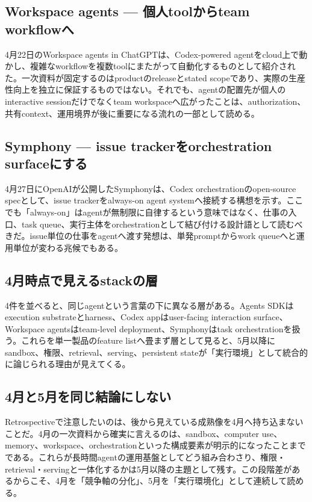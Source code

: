 \subsection{Workspace agents — 個人toolからteam workflowへ}

4月22日のWorkspace agents in ChatGPTは、Codex-powered agentをcloud上で動かし、複雑なworkflowを複数toolにまたがって自動化するものとして紹介された。一次資料が固定するのはproductのreleaseとstated scopeであり、実際の生産性向上を独立に保証するものではない。それでも、agentの配置先が個人のinteractive sessionだけでなくteam workspaceへ広がったことは、authorization、共有context、運用境界が後に重要になる流れの一部として読める。\autocite{src-c71ef79e3212}


\subsection{Symphony — issue trackerをorchestration surfaceにする}

4月27日にOpenAIが公開したSymphonyは、Codex orchestrationのopen-source specとして、issue trackerをalways-on agent systemへ接続する構想を示す。ここでも「always-on」はagentが無制限に自律するという意味ではなく、仕事の入口、task queue、実行主体をorchestrationとして結び付ける設計語として読むべきだ。issue単位の仕事をagentへ渡す発想は、単発promptからwork queueへと運用単位が変わる兆候でもある。\autocite{src-f9ff221789e0}


\subsection{4月時点で見えるstackの層}

4件を並べると、同じagentという言葉の下に異なる層がある。Agents SDKはexecution substrateとharness、Codex appはuser-facing interaction surface、Workspace agentsはteam-level deployment、Symphonyはtask orchestrationを扱う。これらを単一製品のfeature listへ畳まず層として見ると、5月以降にsandbox、権限、retrieval、serving、persistent stateが「実行環境」として統合的に論じられる理由が見えてくる。\autocite{src-1ecdad90bfb4,src-20e34cbfb714,src-c71ef79e3212,src-f9ff221789e0}


\subsection{4月と5月を同じ結論にしない}

Retrospectiveで注意したいのは、後から見えている成熟像を4月へ持ち込まないことだ。4月の一次資料から確実に言えるのは、sandbox、computer use、memory、workspace、orchestrationといった構成要素が明示的になったことまでである。これらが長時間agentの運用基盤としてどう組み合わさり、権限・retrieval・servingと一体化するかは5月以降の主題として残す。この段階差があるからこそ、4月を「競争軸の分化」、5月を「実行環境化」として連続して読める。\autocite{src-1ecdad90bfb4,src-20e34cbfb714,src-c71ef79e3212,src-f9ff221789e0}



